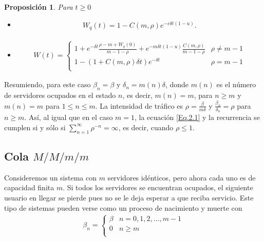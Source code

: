 \documentclass{article}
\newtheorem{Prop}{Proposición}[section]
\numberwithin{equation}{section}
\begin{document}
\begin{Prop}
Para $t\geq0$
\begin{itemize}
\item[a)]
\begin{eqnarray}
W_{q}\left(t\right)=1-C\left(m,\rho\right)e^{-c\delta
t\left(1-u\right)}.
\end{eqnarray} 
\item[b)]\begin{eqnarray}
W\left(t\right)=\left\{\begin{array}{cc}
1+e^{-\delta t}\frac{\rho-m+W_{q}\left(0\right)}{m-1-\rho}+e^{-m\delta t\left(1-u\right)}\frac{C\left(m,\rho\right)}{m-1-\rho} & \rho\neq m-1\\
1-\left(1+C\left(m,\rho\right)\delta t\right)e^{-\delta t} & \rho=m-1\\
\end{array}\right.
\end{eqnarray}
\end{itemize}
\end{Prop}

Resumiendo, para este caso $\beta_{n}=\beta$ y
$\delta_{n}=m\left(n\right)\delta$, donde $m\left(n\right)$ es el n\'umero de servidores ocupados en el estado $n$, es decir,
$m\left(n\right)=m$, para $n\geq m$ y $m\left(n\right)=m$ para
$1\leq n\leq m$. La intensidad de tr\'afico es
$\rho=\frac{\beta}{m\delta}$ y $\frac{\beta_{n}}{\delta_{n}}=\rho$
para $n\geq m$. As\'i, al igual que en el caso $m=1$, la ecuaci\'on
\ref{Eq.2.1} y la recurrencia se cumplen si y s\'olo si
$\sum_{n=1}^{\infty}\rho^{-n}=\infty$, es decir, cuando
$\rho\leq1$. 


%
\subsection{Cola $M/M/m/m$}
%

Consideremos un sistema con $m$ servidores id\'enticos, pero ahora cada uno es de capacidad finita $m$. Si todos los servidores se encuentran ocupados, el siguiente usuario en llegar se pierde pues no se le deja esperar a que reciba servicio. Este tipo de sistemas pueden verse como un proceso de nacimiento y muerte con
\begin{eqnarray}
\beta_{n}=\left\{\begin{array}{cc}
\beta & n=0,1,2,\ldots,m-1\\
0 & n\geq m\\
\end{array}
\right.
\end{eqnarray}
\end{document}
